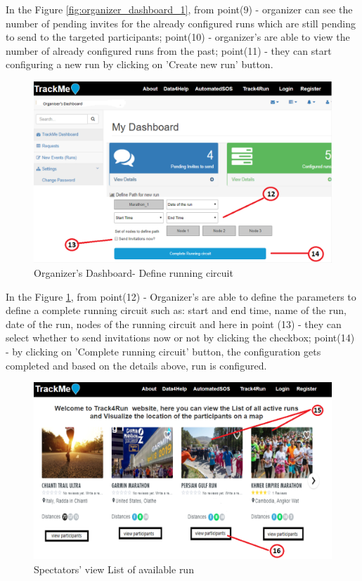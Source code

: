 \documentclass[a4paper, hidelinks, 12pt]{report}
\begin{document}
	In the Figure \ref{fig:organizer_dashboard_1}, from point(9) - organizer can see the number of pending invites for the already configured runs which are still pending to send to the targeted participants; point(10) - organizer's are able to view the number of already configured runs from the past; point(11) - they can start configuring a new run by clicking on 'Create new run' button.
	
	 \begin{figure}[H]
		\centering
		\includegraphics[width=1\textwidth]{../Assets/organizer_dashboard_2.png}\caption[UI: Organizer's Dashboard - Define running circuit]{Organizer's Dashboard- Define running circuit}
		\label{fig:organizer_dashboard_2}
	\end{figure}
	
	In the Figure \ref{fig:organizer_dashboard_2}, from point(12) - Organizer's are able to define the parameters to define a complete running circuit such as: start and end time, name of the run, date of the run, nodes of the running circuit and here in point (13) - they can select whether to send invitations now or not by clicking the checkbox; point(14) - by clicking on 'Complete running circuit' button, the configuration gets completed and based on the details above, run is configured.
	
	\begin{figure}[H]
		\centering
		\includegraphics[width=1\textwidth]{../Assets/t4r_list_of_available_run.png}\caption[UI: Spectators' view List of available run]{Spectators' view List of available run}
		\label{fig:t4r_list_of_available_run}
	\end{figure}
	
\end{document}
